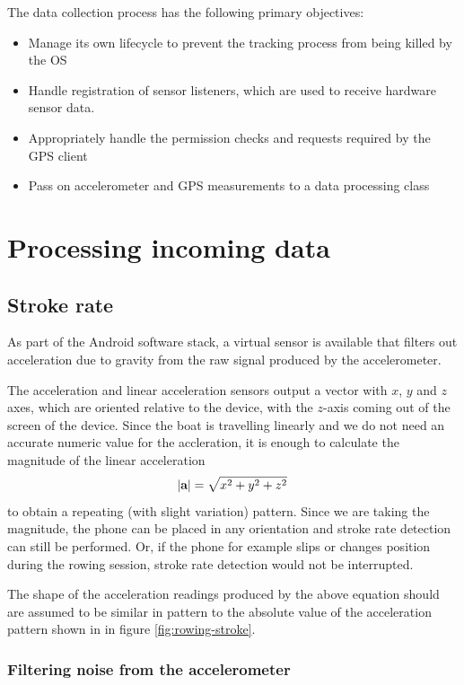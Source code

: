 \documentclass[11pt,twoside,a4paper]{report}
\begin{document}
The data collection process has the following primary objectives:
\begin{itemize}
  \item Manage its own lifecycle to prevent the tracking process from being killed by the OS
  \item Handle registration of sensor listeners, which are used to receive hardware sensor data.
  \item Appropriately handle the permission checks and requests required by the GPS client
  \item Pass on accelerometer and GPS measurements to a data processing class
\end{itemize}

\section{Processing incoming data}

\subsection{Stroke rate}

As part of the Android software stack, a virtual sensor is available that filters out acceleration due to gravity from the raw signal produced by the accelerometer.\cite{android_linear_accel} 

The acceleration and linear acceleration sensors output a vector with $x$, $y$ and $z$ axes, which are oriented relative to the device, with the $z$-axis coming out of the screen of the device. 
Since the boat is travelling linearly and we do not need an accurate numeric value for the accleration, it is enough to calculate the magnitude of the linear acceleration
\[
  \abs{\textbf{a}} = \sqrt{x^2 + y^2 + z^2} 
\] 
to obtain a repeating (with slight variation) pattern. Since we are taking the magnitude, the phone can be placed in any orientation and stroke rate detection can still be performed. Or, if the phone for example slips or changes position during the rowing session, stroke rate detection would not be interrupted. 

The shape of the acceleration readings produced by the above equation should are assumed to be similar in pattern to the absolute value of the acceleration pattern shown in in figure \ref{fig:rowing-stroke}.

\subsubsection{Filtering noise from the accelerometer}
\end{document}

